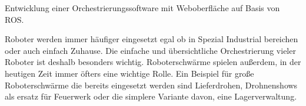 \begin{flushleft}
    Entwicklung einer Orchestrierungssoftware mit Weboberfläche auf Basis von ROS.

    Roboter werden immer häufiger eingesetzt egal ob in Spezial Industrial bereichen oder auch einfach Zuhause.
    Die einfache und übersichtliche Orchestrierung vieler Roboter ist deshalb besonders wichtig.
    Roboterschwärme spielen außerdem, in der heutigen Zeit immer öfters eine wichtige Rolle.
    Ein Beispiel für große Roboterschwärme die bereits eingesetzt werden sind Lieferdrohen, Drohnenshows als 
    ersatz für Feuerwerk oder die simplere Variante davon, eine Lagerverwaltung.
\end{flushleft}